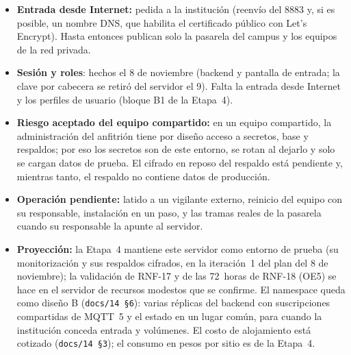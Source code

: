 \begin{itemize}
\item \textbf{Entrada desde Internet:} pedida a la institución (reenvío del 8883 y, si es posible, un nombre DNS, que habilita el certificado
  público con Let's Encrypt). Hasta entonces publican solo la pasarela del campus y los equipos de la red privada.
\item \textbf{Sesión y roles}: hechos el 8 de noviembre (backend y pantalla de entrada; la clave por cabecera se retiró del servidor el 9). Falta la entrada desde Internet y los perfiles de usuario (bloque B1 de la Etapa~4).
\item \textbf{Riesgo aceptado del equipo compartido:} en un equipo compartido, la administración del anfitrión tiene por diseño acceso a secretos, base y respaldos; por eso los secretos son de este entorno, se rotan al dejarlo y solo se cargan datos de prueba. El cifrado en reposo del respaldo está pendiente y, mientras tanto, el respaldo no contiene datos de producción.
\item \textbf{Operación pendiente:} latido a un vigilante externo, reinicio del equipo con su responsable, instalación en un paso, y las
  tramas reales de la pasarela cuando su responsable la apunte al servidor.
\item \textbf{Proyección:} la Etapa~4 mantiene este servidor como entorno de prueba (su monitorización y sus respaldos cifrados, en la iteración~1 del plan del 8 de noviembre); la validación de RNF-17 y de las 72~horas de RNF-18 (OE5) se hace en el servidor de recursos modestos que se confirme. El namespace queda como diseño B (\texttt{docs/14 §6}): varias réplicas del backend con suscripciones compartidas de MQTT~5 y el estado en un lugar común, para cuando la institución conceda entrada y volúmenes. El costo de alojamiento está cotizado (\texttt{docs/14 §3}); el consumo en pesos por sitio es de la Etapa~4.
\end{itemize}
